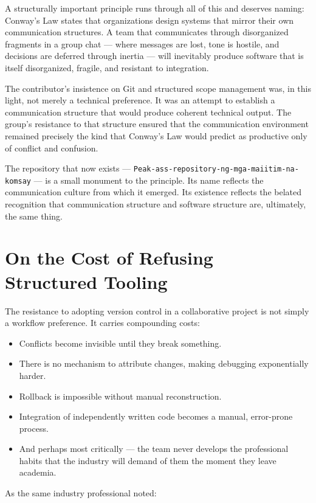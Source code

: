 \documentclass[11pt,a4paper]{book}
\begin{document}
A structurally important principle runs through all of this and deserves naming: Conway's Law states that organizations design systems that mirror their own communication structures. A team that communicates through disorganized fragments in a group chat --- where messages are lost, tone is hostile, and decisions are deferred through inertia --- will inevitably produce software that is itself disorganized, fragile, and resistant to integration.
 
The contributor's insistence on Git and structured scope management was, in this light, not merely a technical preference. It was an attempt to establish a communication structure that would produce coherent technical output. The group's resistance to that structure ensured that the communication environment remained precisely the kind that Conway's Law would predict as productive only of conflict and confusion.
 
The repository that now exists --- \texttt{Peak-ass-repository-ng-mga-maiitim-na-komsay} --- is a small monument to the principle. Its name reflects the communication culture from which it emerged. Its existence reflects the belated recognition that communication structure and software structure are, ultimately, the same thing.
 
\section{On the Cost of Refusing Structured Tooling}
 
The resistance to adopting version control in a collaborative project is not simply a workflow preference. It carries compounding costs:
 
\begin{itemize}
    \item Conflicts become invisible until they break something.
    \item There is no mechanism to attribute changes, making debugging exponentially harder.
    \item Rollback is impossible without manual reconstruction.
    \item Integration of independently written code becomes a manual, error-prone process.
    \item And perhaps most critically --- the team never develops the professional habits that the industry will demand of them the moment they leave academia.
\end{itemize}
 
As the same industry professional noted:
 
\end{document}
